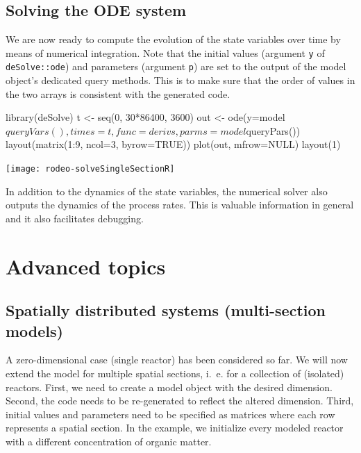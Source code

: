 \documentclass[onecolumn]{article}
\begin{document}
\subsection{Solving the ODE system} \label{sec:solve-R}

We are now ready to compute the evolution of the state variables over time by means of numerical integration. Note that the initial values (argument \verb|y| of \verb|deSolve::ode|) and parameters (argument \verb|p|) are set to the output of the model object's dedicated query methods. This is to make sure that the order of values in the two arrays is consistent with the generated code.

\begin{Schunk}
\begin{Sinput}
 library(deSolve)
 t <- seq(0, 30*86400, 3600)
 out <- ode(y=model$queryVars(), times=t, func=derivs,
   parms=model$queryPars())
 layout(matrix(1:9, ncol=3, byrow=TRUE))
 plot(out, mfrow=NULL)
 layout(1)
\end{Sinput}
\end{Schunk}
\texttt{[image: rodeo-solveSingleSectionR]}

In addition to the dynamics of the state variables, the numerical solver also outputs the dynamics of the process rates. This is valuable information in general and it also facilitates debugging.


\clearpage
\section{Advanced topics} \label{sec:advanced}


\subsection{Spatially distributed systems (multi-section models)} \label{sec:advanced:multiSect}

A zero-dimensional case (single reactor) has been considered so far. We will now extend the model for multiple spatial sections, i.~e. for a collection of (isolated) reactors. First, we need to create a model object with the desired dimension. Second, the code needs to be re-generated to reflect the altered dimension. Third, initial values and parameters need to be specified as matrices where each row represents a spatial section. In the example, we initialize every modeled reactor with a different concentration of organic matter.
\end{document}
